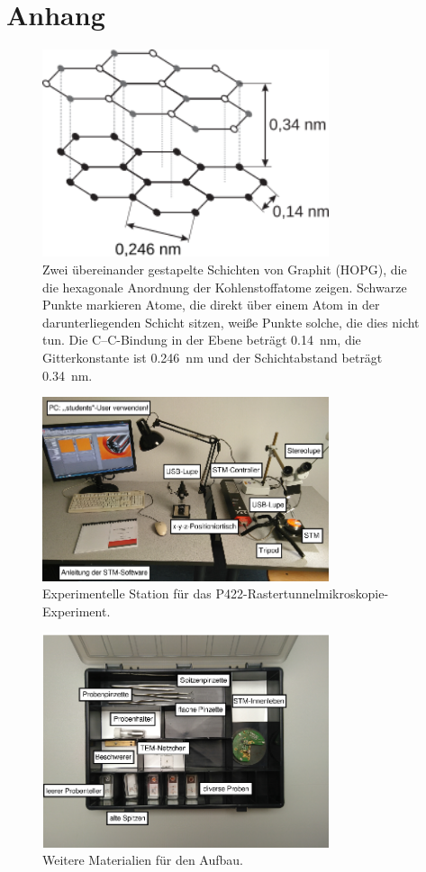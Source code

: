 \chapter{Anhang}

\begin{figure}[htbp]
    \centering
    \includegraphics[width=0.75\textwidth]{figs/HOPG_struktur.png}
    \caption{Zwei übereinander gestapelte Schichten von Graphit (HOPG), die die hexagonale Anordnung der Kohlenstoffatome zeigen. Schwarze Punkte markieren Atome, die direkt über einem Atom in der darunterliegenden Schicht sitzen, weiße Punkte solche, die dies nicht tun. Die C–C-Bindung in der Ebene beträgt \SI{0.14}{\nano\metre}, die Gitterkonstante ist \SI{0.246}{\nano\metre} und der Schichtabstand beträgt \SI{0.34}{\nano\metre}.  \cite{praktikum}}
    \label{fig:HOPG struktur}
\end{figure}

\begin{figure}[htbp]
    \centering
    \includegraphics[width=0.75\textwidth]{figs/Versuchsaufbau1.png}
    \caption{Experimentelle Station für das P422-Rastertunnelmikroskopie-Experiment. \cite{praktikum}}
    \label{fig:Versuchaufbau1}    
\end{figure}

\begin{figure}
    \centering
    \includegraphics[width=0.75\textwidth]{figs/Versuch_box}
    \caption{Weitere Materialien für den Aufbau. \cite{praktikum}}
    \label{fig:Versuch box}
\end{figure}